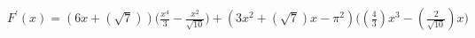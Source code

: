 $ \displaystyle F^{\prime}(x) = (6x + (\sqrt{7})) \Big(  \frac{x^4}{3} - \frac{x^2}{\sqrt{10}} \Big) + (3x^2 + (\sqrt{7})x - \pi^2) \Big(  \left(\frac{4}{3}\right)x^3 - \left(\frac{2}{\sqrt{10}} \right)x\Big) $